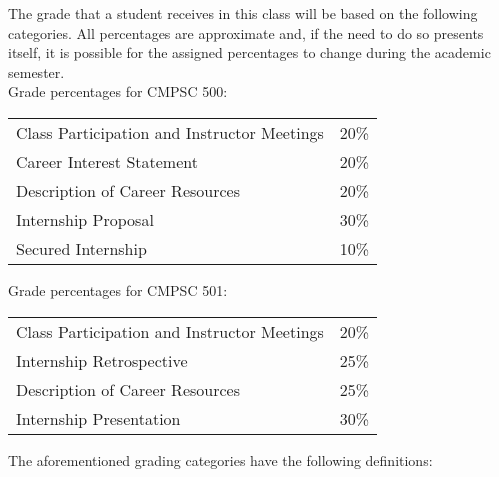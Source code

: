 The grade that a student receives in this class will be based on the following categories. All percentages are
approximate and, if the need to do so presents itself, it is possible for the assigned percentages to change during the
academic semester. \\

Grade percentages for CMPSC 500:
\begin{center}
\begin{tabular}{ll}
Class Participation and Instructor Meetings & 20\% \\
Career Interest Statement & 20\% \\
Description of Career Resources & 20\% \\
Internship Proposal & 30\% \\
Secured Internship & 10\% \\
\end{tabular}
\end{center}

\newpage
Grade percentages for CMPSC 501:

\vspace{-.1in}
\begin{center}
\begin{tabular}{ll}
Class Participation and Instructor Meetings & 20\% \\
Internship Retrospective & 25\% \\
Description of Career Resources & 25\% \\
Internship Presentation & 30\% \\
\end{tabular}
\end{center}

\noindent
The aforementioned grading categories have the following definitions:

